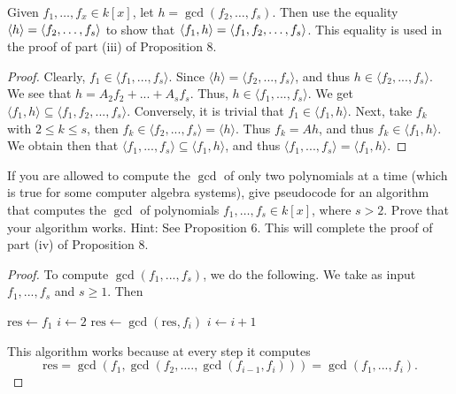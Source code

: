 \begin{exercise}{6}
Given $f_1,\dots,f_x\in k[x]$, let $h=\gcd(f_2,\dots,f_s)$. Then use the equality $\langle h\rangle=\langle f_2,\dots,f_s\rangle$ to show that $\langle f_1,h\rangle=\langle f_1,f_2,\dots,f_s\rangle$. This equality is used in the proof of part (iii) of Proposition 8.
\end{exercise}
\begin{proof}
Clearly, $f_1\in \langle f_1,...,f_s\rangle$. Since $\langle h\rangle = \langle f_2,...,f_s\rangle$, and thus $h\in \langle f_2,...,f_s\rangle$. We see that $h = A_2 f_2 + ... + A_s f_s$. Thus, $h\in \langle f_1,...,f_s\rangle$. We get $\langle f_1,h\rangle\subseteq \langle f_1,f_2,...,f_s\rangle$. Conversely, it is trivial that $f_1\in \langle f_1,h\rangle$. Next, take $f_k$ with $2\leq k\leq s$, then $f_k\in \langle f_2,...,f_s\rangle = \langle h\rangle$. Thus $f_k = Ah$, and thus $f_k\in\langle f_1,h\rangle$. We obtain then that $\langle f_1,...,f_s\rangle \subseteq \langle f_1,h\rangle$, and thus $\langle f_1,...,f_s\rangle = \langle f_1,h\rangle$.
\end{proof}

\begin{exercise}{7}
If you are allowed to compute the $\gcd$ of only two polynomials at a time (which is true for some computer algebra systems), give pseudocode for an algorithm that computes the $\gcd$ of polynomials $f_1,\dots,f_s\in k[x]$, where $s>2$. Prove that your algorithm works. Hint: See Proposition 6. This will complete the proof of part (iv) of Proposition 8.
\end{exercise}
\begin{proof}
To compute $\gcd(f_1,...,f_s)$, we do the following. We take as input $f_1,...,f_s$ and $s\geq 1$. Then
\begin{center}
\begin{algorithmic}
\STATE $\text{res}\gets f_1$
\STATE $i\gets 2$
    \STATE $\text{res}\gets \gcd(\text{res}, f_i)$
    \STATE $i\gets i+1$
\ENDWHILE
\end{algorithmic}
\end{center}
This algorithm works because at every step it computes
$$\text{res} = \gcd(f_1,\gcd(f_2,....,\gcd(f_{i-1},f_i))) = \gcd(f_1,...,f_i).$$
\end{proof}

